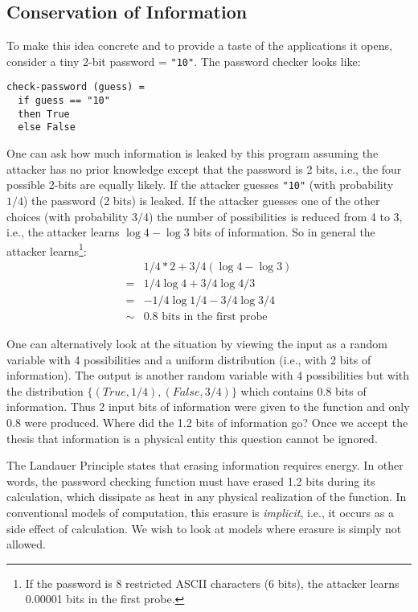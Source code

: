 \documentclass{article}
\begin{document}
\subsection{Conservation of Information}

To make this idea concrete and to provide a taste of the applications
it opens, consider a tiny 2-bit password = \verb|"10"|. The password
checker looks like:

\begin{verbatim}
check-password (guess) =
  if guess == "10"
  then True
  else False
\end{verbatim}

One can ask how much information is leaked by this program assuming
the attacker has no prior knowledge except that the password is 2
bits, i.e., the four possible 2-bits are equally likely. If the
attacker guesses \verb|"10"| (with probability $1/4$) the password (2
bits) is leaked. If the attacker guesses one of the other choices
(with probability $3/4$) the number of possibilities is reduced from 4
to 3, i.e., the attacker learns $\log{4} - \log{3}$ bits of
information. So in general the attacker learns\footnote{If the
  password is 8 restricted ASCII characters (6 bits), the attacker
  learns 0.00001 bits in the first probe.}:
\[\begin{array}{ll}
   &  1/4 * 2 + 3/4 (\log{4} - \log{3}) \\
  =&  1/4 \log{4} + 3/4 \log{4/3} \\
  =&  - 1/4 \log{1/4} - 3/4 \log{3/4} \\
  \sim& 0.8 \mbox{~bits~in~the~first~probe}
\end{array}\]

One can alternatively look at the situation by viewing the input as a
random variable with 4 possibilities and a uniform distribution (i.e.,
with 2 bits of information). The output is another random variable
with 4 possibilities but with the distribution
$\{ (True, 1/4), (False, 3/4) \}$ which contains 0.8 bits of
information. Thus 2 input bits of information were given to the
function and only 0.8 were produced. Where did the 1.2 bits of
information go? Once we accept the thesis that information is a
physical entity this question cannot be ignored.

The Landauer Principle states that erasing information requires
energy. In other words, the password checking function must have
erased 1.2 bits during its calculation, which dissipate as heat in any
physical realization of the function. In conventional models of
computation, this erasure is \emph{implicit}, i.e., it occurs as a
side effect of calculation. We wish to look at models where
erasure is simply not allowed.
\end{document}
